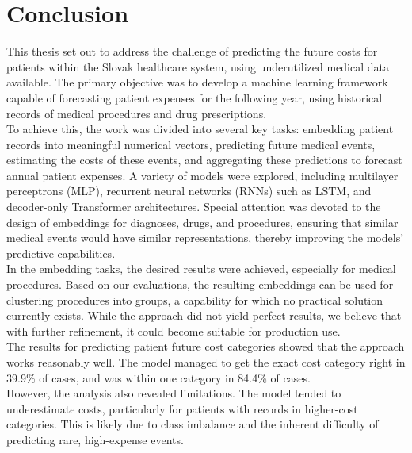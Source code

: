 
\chapter*{Conclusion}

This thesis set out to address the challenge of predicting the future costs for patients within the Slovak healthcare system, using underutilized medical data available. The primary objective was to develop a machine learning framework capable of forecasting patient expenses for the following year, using historical records of medical procedures and drug prescriptions.
\\

To achieve this, the work was divided into several key tasks: embedding patient records into meaningful numerical vectors, predicting future medical events, estimating the costs of these events, and aggregating these predictions to forecast annual patient expenses. A variety of models were explored, including multilayer perceptrons (MLP), recurrent neural networks (RNNs) such as LSTM, and decoder-only Transformer architectures. Special attention was devoted to the design of embeddings for diagnoses, drugs, and procedures, ensuring that similar medical events would have similar representations, thereby improving the models’ predictive capabilities.
\\

In the embedding tasks, the desired results were achieved, especially for medical procedures. Based on our evaluations, the resulting embeddings can be used for clustering procedures into groups, a capability for which no practical solution currently exists. While the approach did not yield perfect results, we believe that with further refinement, it could become suitable for production use.
\\

The results for predicting patient future cost categories showed that the approach works reasonably well. The model managed to get the exact cost category right in 39.9\% of cases, and was within one category in 84.4\% of cases.
\\

However, the analysis also revealed limitations. The model tended to underestimate costs, particularly for patients with records in higher-cost categories. This is likely due to class imbalance and the inherent difficulty of predicting rare, high-expense events.
\\

